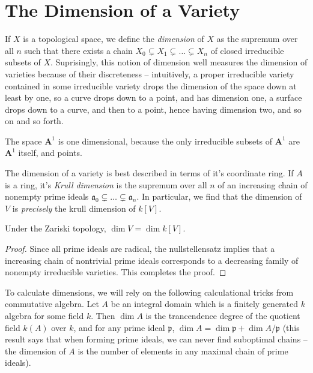 \section{The Dimension of a Variety}

If $X$ is a topological space, we define the \emph{dimension} of $X$ as the supremum over all $n$ such that there exists a chain $X_0 \subsetneq X_1 \subsetneq \dots \subsetneq X_n$ of closed irreducible subsets of $X$. Suprisingly, this notion of dimension well measures the dimension of varieties because of their discreteness -- intuitively, a proper irreducible variety contained in some irreducible variety drops the dimension of the space down at least by one, so a curve drops down to a point, and has dimension one, a surface drops down to a curve, and then to a point, hence having dimension two, and so on and so forth.

\begin{example}
    The space $\mathbf{A}^1$ is one dimensional, because the only irreducible subsets of $\mathbf{A}^1$ are $\mathbf{A}^1$ itself, and points.
\end{example}

The dimension of a variety is best described in terms of it's coordinate ring. If $A$ is a ring, it's \emph{Krull dimension} is the supremum over all $n$ of an increasing chain of nonempty prime ideals $\mathfrak{a}_0 \subsetneq \dots \subsetneq \mathfrak{a}_n$. In particular, we find that the dimension of $V$ is {\it precisely} the krull dimension of $k[V]$.

\begin{theorem}
    Under the Zariski topology, $\dim V = \dim k[V]$.
\end{theorem}
\begin{proof}
    Since all prime ideals are radical, the nullstellensatz implies that a increasing chain of nontrivial prime ideals corresponds to a decreasing family of nonempty irreducible varieties. This completes the proof.
\end{proof}

To calculate dimensions, we will rely on the following calculational tricks from commutative algebra. Let $A$ be an integral domain which is a finitely generated $k$ algebra for some field $k$. Then $\dim A$ is the trancendence degree of the quotient field $k(A)$ over $k$, and for any prime ideal $\mathfrak{p}$, $\dim A = \dim \mathfrak{p} + \dim A/\mathfrak{p}$ (this result says that when forming prime ideals, we can never find suboptimal chains -- the dimension of $A$ is the number of elements in any maximal chain of prime ideals).

